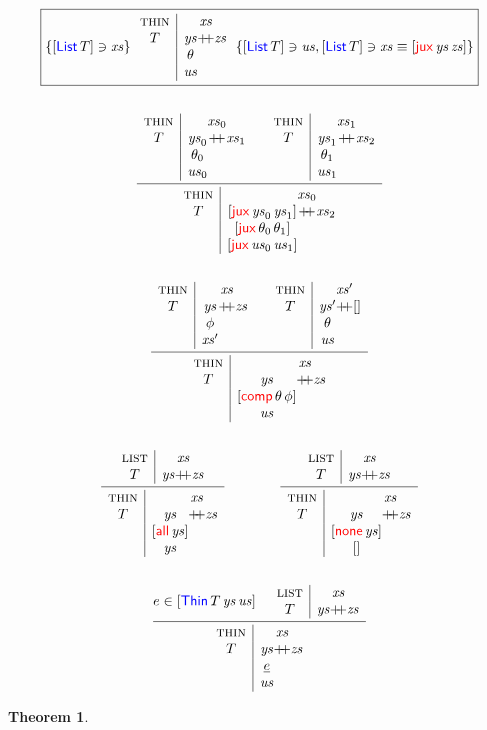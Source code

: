 \documentclass[12pt, a4paper]{article}
\makeatletter
\newcommand{\Type}{\textsc{type}\;}
\newcommand{\Nil}{\mathbf{[]}}
\newcommand{\Prop}{\mathsf{Prop}}
\newcommand{\Term}{\mathsf{Term}}
\newcommand{\gp}{\,}
\newcommand{\C}[1]{\textcolor{red}{\mathsf{#1}}}
\newcommand{\D}[1]{\textcolor{blue}{\mathsf{#1}}}
\newcommand{\List}[1]{[ \D{List} \gp {#1} ]}
\newcommand{\jux}[2]{[ \C{jux} \gp {#1} \gp {#2}]}
\newcommand{\Thin}[3]{[ \D{Thin} \gp {#1} \gp {#2} \gp {#3} ]}
\newcommand{\thAll}[1]{[ \C{all} \gp {#1}]}
\newcommand{\thNone}[1]{[ \C{none} \gp {#1}]}
\newcommand{\thComp}[2]{[ \C{comp} \gp {#1} \gp {#2}]}
\newcommand{\thJux}[2]{[ \C{jux} \gp {#1} \gp {#2}]}
\newcommand{\checkType}[2]{{#1} \ni {#2}}
\newcommand{\synthType}[2]{{#1} \in {#2}}
\newcommand{\checkThin}[6]{
  \begin{array}{c|c@{}c@{}c}
    \textsc{thin}&& {#2} &  \\
    {#1} & {#5} & +\!\!+ & {#6} \\
         & {#3} &        &      \\
         & {#4} &        &
  \end{array}
}
\newcommand{\chopList}[4]{
  \begin{array}{c|c@{}c@{}c}
    \textsc{list}&& \hspace*{-0.5cm}{#2}\hspace*{-0.5cm} &  \\
    {#1} & {#3} & +\!\!+ & {#4}
  \end{array}
}
\newcommand{\neu}[1]{\underline{#1}}
\newcommand{\V}[1]{\mathit{#1}}
\newtheorem{thm}{Theorem}
\makeatother
\begin{document}
\begin{gather*}
  \fbox{$ \{\checkType{\List{T}}{\V{xs}}\}
    \gp \checkThin{T}{\V{xs}}{\theta}{\V{us}}{\V{ys}}{\V{zs}}
    \gp \{\checkType{\List{T}}{\V{us}},
        \checkType{\List{T}}{\V{xs}\equiv\jux{\V{ys}}{\V{zs}}} \} $}
  \\ \\
  \infer
    {\checkThin{T}{\V{xs}_{0}}{\thJux{\theta_{0}}{\theta_{1}}}{\jux{\V{us}_{0}}{\V{us}_{1}}}{\jux{\V{ys}_{0}}{\V{ys}_{1}}}{\V{xs}_{2}}}
    {\checkThin{T}{\V{xs}_{0}}{\theta_{0}}{\V{us}_{0}}{\V{ys}_{0}}{\V{xs}_{1}} &
     \checkThin{T}{\V{xs}_{1}}{\theta_{1}}{\V{us}_{1}}{\V{ys}_{1}}{\V{xs}_{2}}}
  \\ \\
  \infer
    {\checkThin{T}{\V{xs}}{\thComp{\theta}{\phi}}{\V{us}}{\V{ys}}{\V{zs}}}
    {\checkThin{T}{\V{xs}}{\phi}{\V{xs}'}{\V{ys}}{\V{zs}} &
     \checkThin{T}{\V{xs}'}{\theta}{\V{us}}{\V{ys}'}{\Nil}}
  \\  \\
  \infer
    {\checkThin{T}{\V{xs}}{\thAll{\V{ys}}}{\V{ys}}{\V{ys}}{\V{zs}}}
    {\chopList{T}{\V{xs}}{\V{ys}}{\V{zs}}}
  \qquad\qquad
  \infer
    {\checkThin{T}{\V{xs}}{\thNone{\V{ys}}}{\Nil}{\V{ys}}{\V{zs}}}
    {\chopList{T}{\V{xs}}{\V{ys}}{\V{zs}}}
  \\ \\
  \infer
    {\checkThin{T}{\V{xs}}{\neu{e}}{\V{us}}{\V{ys}}{\V{zs}}}
    {\synthType{e}{\Thin{T}{\V{ys}}{\V{us}}} &
     \chopList{T}{\V{xs}}{\V{ys}}{\V{zs}}}
\end{gather*}

\begin{thm}

\end{thm}



\end{document}
